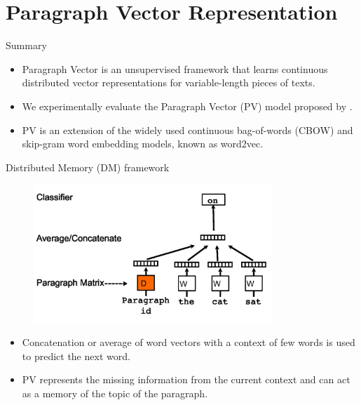 \documentclass[10pt]{beamer}
\begin{document}
\section{Paragraph Vector Representation}

\begin{frame}{Summary}
\begin{itemize}
\item Paragraph Vector is an unsupervised framework that learns continuous distributed vector representations for variable-length pieces of texts.
\item We experimentally evaluate the Paragraph Vector (PV) model proposed by \cite{le2014distributed}.
\item PV is an extension of the widely used continuous bag-of-words (CBOW) and skip-gram word embedding models, known as word2vec.
\end{itemize}
\end{frame}

\begin{frame}{Distributed Memory (DM) framework}
	\begin{figure}[t!]
	  \centering
	  \includegraphics[keepaspectratio, width=0.8\textwidth]{./Pictures/pv-dm.png}
	  \label{fig:pv-dm}
	\end{figure}
	
	\begin{itemize}
	\item Concatenation or average of word vectors with a context of few words is used to predict the next word.
	\item PV represents the missing information from the current context and can act as a memory of the topic of the paragraph.	
	\end{itemize}
\end{frame}
\end{document}
